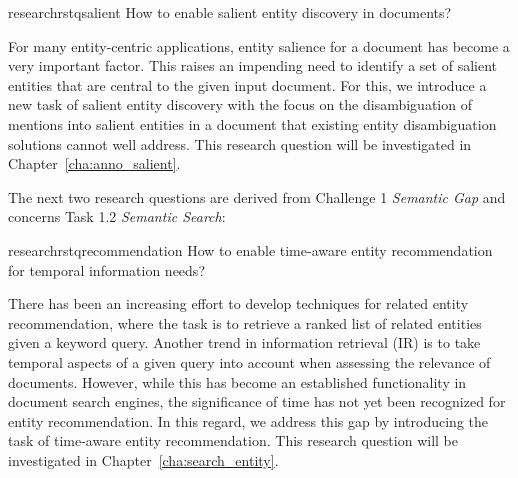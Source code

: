 \begin{restatable}{research}{rstqsalient} \label{q:salient}
How to enable salient entity discovery in documents?
\end{restatable}
\vspace{-0.9em}
For many entity-centric applications, entity salience for a document has become a very important factor. This raises an impending need to identify a set of salient entities that are central to the given input document. For this, we introduce a new task of salient entity discovery with the focus on the disambiguation of mentions into salient entities in a document that existing entity disambiguation solutions cannot well address. This research question will be investigated in Chapter~\ref{cha:anno_salient}. 

\noindent The next two research questions are derived from Challenge 1 \emph{Semantic Gap} and concerns Task 1.2 \emph{Semantic Search}:

\begin{restatable}{research}{rstqrecommendation} \label{q:recommendation}
How to enable time-aware entity recommendation for temporal information needs?
\end{restatable}
\vspace{-0.9em}
There has been an increasing effort to develop techniques for related entity recommendation, where the task is to retrieve a ranked list of related entities given a keyword query. Another trend in information retrieval (IR) is to take temporal aspects of a given query into account when assessing the relevance of documents. However, while this has become an established functionality in document search engines, the significance of time has not yet been recognized for entity recommendation. In this regard, we address this gap by introducing the task of time-aware entity recommendation. This research question will be investigated in Chapter~\ref{cha:search_entity}. 


